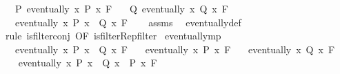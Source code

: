 \begin{isabellebody}
\ \ \ P{\isacharcolon}{\kern0pt}\ {\isachardoublequoteopen}eventually\ {\isacharparenleft}{\kern0pt}{\isasymlambda}x{\isachardot}{\kern0pt}\ P\ x{\isacharparenright}{\kern0pt}\ F{\isachardoublequoteclose}\isanewline
\ \ \ Q{\isacharcolon}{\kern0pt}\ {\isachardoublequoteopen}eventually\ {\isacharparenleft}{\kern0pt}{\isasymlambda}x{\isachardot}{\kern0pt}\ Q\ x{\isacharparenright}{\kern0pt}\ F{\isachardoublequoteclose}\isanewline
\ \ \ {\isachardoublequoteopen}eventually\ {\isacharparenleft}{\kern0pt}{\isasymlambda}x{\isachardot}{\kern0pt}\ P\ x\ {\isasymand}\ Q\ x{\isacharparenright}{\kern0pt}\ F{\isachardoublequoteclose}\isanewline
%
\isadelimproof
\ \ %
\endisadelimproof
%
\isatagproof
{}\isamarkupfalse%
\ assms\ \isamarkupfalse%
\ eventually{\isacharunderscore}{\kern0pt}def\isanewline
\ \ \isamarkupfalse%
\ {\isacharparenleft}{\kern0pt}rule\ is{\isacharunderscore}{\kern0pt}filter{\isachardot}{\kern0pt}conj\ {\isacharbrackleft}{\kern0pt}OF\ is{\isacharunderscore}{\kern0pt}filter{\isacharunderscore}{\kern0pt}Rep{\isacharunderscore}{\kern0pt}filter{\isacharbrackright}{\kern0pt}{\isacharparenright}{\kern0pt}%
\endisatagproof
{\isafoldproof}%
%
\isadelimproof
\isanewline
%
\endisadelimproof
\isanewline
{}\isamarkupfalse%
\ eventually{\isacharunderscore}{\kern0pt}mp{\isacharcolon}{\kern0pt}\isanewline
\ \ \ {\isachardoublequoteopen}eventually\ {\isacharparenleft}{\kern0pt}{\isasymlambda}x{\isachardot}{\kern0pt}\ P\ x\ {\isasymlongrightarrow}\ Q\ x{\isacharparenright}{\kern0pt}\ F{\isachardoublequoteclose}\isanewline
\ \ \ {\isachardoublequoteopen}eventually\ {\isacharparenleft}{\kern0pt}{\isasymlambda}x{\isachardot}{\kern0pt}\ P\ x{\isacharparenright}{\kern0pt}\ F{\isachardoublequoteclose}\isanewline
\ \ \ {\isachardoublequoteopen}eventually\ {\isacharparenleft}{\kern0pt}{\isasymlambda}x{\isachardot}{\kern0pt}\ Q\ x{\isacharparenright}{\kern0pt}\ F{\isachardoublequoteclose}\isanewline
%
\isadelimproof
%
\endisadelimproof
%
\isatagproof
{}\isamarkupfalse%
\ {\isacharminus}{\kern0pt}\isanewline
\ \ \isamarkupfalse%
\ {\isachardoublequoteopen}eventually\ {\isacharparenleft}{\kern0pt}{\isasymlambda}x{\isachardot}{\kern0pt}\ {\isacharparenleft}{\kern0pt}P\ x\ {\isasymlongrightarrow}\ Q\ x{\isacharparenright}{\kern0pt}\ {\isasymand}\ P\ x{\isacharparenright}{\kern0pt}\ F{\isachardoublequoteclose}\isanewline
\ \ \ \ \isamarkupfalse%

\end{isabellebody}
